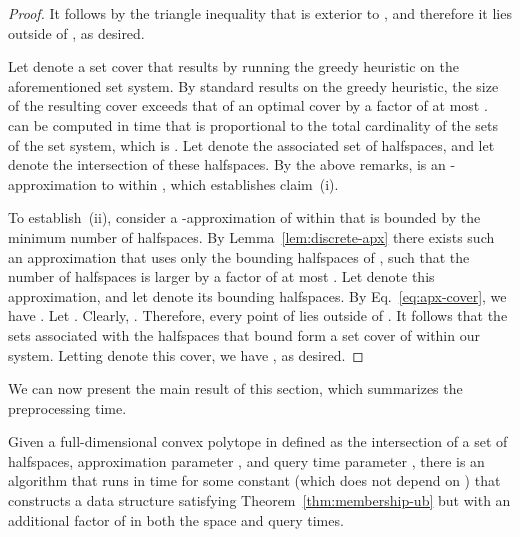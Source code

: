 \documentclass[11pt]{article}   \usepackage[letterpaper,hmargin=2.1cm,vmargin=3cm]{geometry}
\begin{document}
\begin{proof}
It follows by the triangle inequality that  is exterior to , and therefore it lies outside of , as desired.

Let  denote a set cover that results by running the greedy heuristic \cite{CLRS} on the aforementioned set system. By standard results on the greedy heuristic, the size of the resulting cover exceeds that of an optimal cover by a factor of at most .  can be computed in time that is proportional to the total cardinality of the sets of the set system, which is . Let  denote the associated set of halfspaces, and let  denote the intersection of these halfspaces. By the above remarks,  is an -approximation to  within , which establishes claim~(i).

To establish~(ii), consider a -approximation of  within  that is bounded by the minimum number  of halfspaces. By Lemma~\ref{lem:discrete-apx} there exists such an approximation that uses only the bounding halfspaces of , such that the number of halfspaces is larger by a factor of at most . Let  denote this approximation, and let  denote its bounding halfspaces. By Eq.~\eqref{eq:apx-cover}, we have . Let . Clearly, . Therefore, every point of  lies outside of . It follows that the sets  associated with the halfspaces  that bound  form a set cover of  within our system. Letting  denote this cover, we have , as desired.
\end{proof}


We can now present the main result of this section, which summarizes the preprocessing time.

\begin{lemma} \label{lem:preproc-time}
Given a full-dimensional convex polytope  in  defined as the intersection of a set of  halfspaces, approximation parameter , and query time parameter , there is an algorithm that runs in time  for some constant  (which does not depend on ) that constructs a data structure satisfying Theorem~\ref{thm:membership-ub} but with an additional factor of  in both the space and query times.
\end{lemma}
\end{document}
